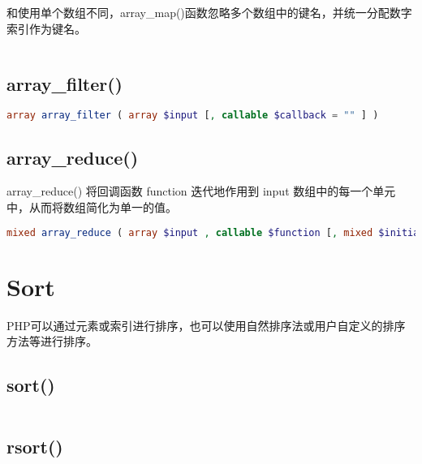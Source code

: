 和使用单个数组不同，array\_map()函数忽略多个数组中的键名，并统一分配数字索引作为键名。


\begin{lstlisting}[language=PHP]

\end{lstlisting}


\subsection{array\_filter()}



\begin{lstlisting}[language=PHP]
array array_filter ( array $input [, callable $callback = "" ] )
\end{lstlisting}

\subsection{array\_reduce()}

array_reduce() 将回调函数 function 迭代地作用到 input 数组中的每一个单元中，从而将数组简化为单一的值。

\begin{lstlisting}[language=PHP]
mixed array_reduce ( array $input , callable $function [, mixed $initial = NULL ] )
\end{lstlisting}



\section{Sort}

PHP可以通过元素或索引进行排序，也可以使用自然排序法或用户自定义的排序方法等进行排序。

\subsection{sort()}


\begin{lstlisting}[language=PHP]

\end{lstlisting}


\subsection{rsort()}


\begin{lstlisting}[language=PHP]

\end{lstlisting}


